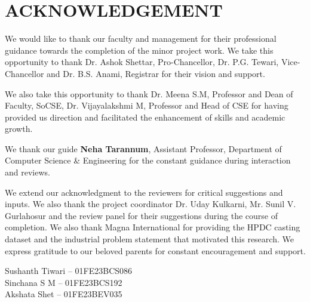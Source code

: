\chapter*{ACKNOWLEDGEMENT}

\begin{justify}
We would like to thank our faculty and management for their professional guidance towards the completion of the minor project work. We take this opportunity to thank Dr. Ashok Shettar, Pro-Chancellor, Dr. P.G. Tewari, Vice-Chancellor and Dr. B.S. Anami, Registrar for their vision and support.

We also take this opportunity to thank Dr. Meena S.M, Professor and Dean of Faculty, SoCSE, Dr. Vijayalakshmi M, Professor and Head of CSE for having provided us direction and facilitated the enhancement of skills and academic growth.

We thank our guide \textbf{Neha Tarannum}, Assistant Professor, Department of Computer Science \& Engineering for the constant guidance during interaction and reviews.

We extend our acknowledgment to the reviewers for critical suggestions and inputs. We also thank the project coordinator Dr. Uday Kulkarni, Mr. Sunil V. Gurlahosur and the review panel for their suggestions during the course of completion. We also thank Magna International for providing the HPDC casting dataset and the industrial problem statement that motivated this research. We express gratitude to our beloved parents for constant encouragement and support.
\end{justify}

\begin{flushright}
\vspace{2cm}
Sushanth Tiwari -- 01FE23BCS086\\[4pt]
Sinchana S M -- 01FE23BCS192\\[4pt]
Akshata Shet -- 01FE23BEV035
\end{flushright}
